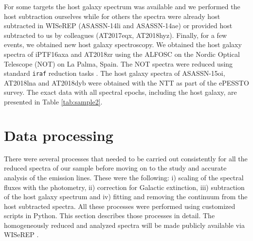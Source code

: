 \documentclass[structabstract]{aa}
\begin{document}
For some targets the host galaxy spectrum was available and we performed the host subtraction ourselves while for others the spectra were already host subtracted in WISeREP (ASASSN-14li and ASASSN-14ae) or provided host subtracted to us by colleagues (AT2017eqx, AT2018hyz).
Finally, for a few events, we obtained new host galaxy spectroscopy. We obtained the host galaxy spectra of iPTF16axa and AT2018zr using the ALFOSC on the Nordic Optical Telescope (NOT) on La Palma, Spain. The NOT spectra were reduced using standard \texttt{iraf} reduction tasks \citep{Tody1986}. The host galaxy spectra of ASASSN-15oi, AT2018lna and AT2018dyb were obtained with the NTT as part of the ePESSTO survey.
The exact data with all spectral epochs, including the host galaxy, are presented in Table \ref{tab:sample2}.


\section{Data processing} \label{sec:analysis}

There were several processes that needed to be carried out consistently for all the reduced spectra of our sample before moving on to the study and accurate analysis of the emission lines. These were the following: i) scaling of the spectral fluxes with the photometry, ii) correction for Galactic extinction, iii) subtraction of the host galaxy spectrum and iv) fitting and removing the continuum from the host subtracted spectra. All these processes were performed using customized scripts in Python. This section describes those processes in detail. 
The homogeneously reduced and analyzed spectra will be made publicly available via WISeREP \citep{Yaron2012}.
\end{document}
